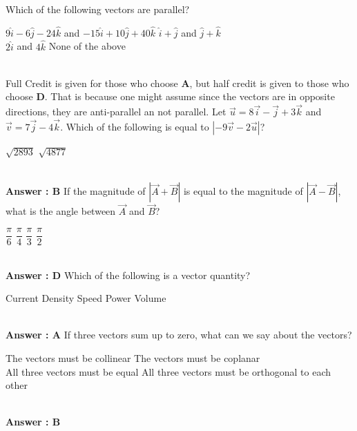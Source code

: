 \documentclass[12pt,addpoints]{exam}
\begin{document}
{{{\begin{questions}
					\question Which of the following vectors are parallel? \\
					\begin{oneparchoices}
						\choice $9\hat i - 6\hat j - 24\hat k$ and $-15\hat i+ 10\hat j+ 40\hat k$
						\choice $\hat i + \hat j$ and $\hat j+ \hat k$ \\
						\choice $2\hat i$ and $4\hat k$
						\choice None of the above
					\end{oneparchoices}
					\\ Full Credit is given for those who choose \textbf{A}, but half credit is given to those who choose \textbf{D}. That is because one might assume since the vectors are in opposite directions, they are anti-parallel an not parallel.
					\question Let $\vec u = 8\vec i - \vec j + 3\vec k$ and $\vec v = 7\vec j - 4\vec k$. Which of the following is equal to $| { - 9\vec v - 2\vec u}|$? \\
					\begin{oneparchoices}
						\choice $\sqrt{2893}$
						\choice $\sqrt{4877}$
						\choice 26
						\choice 90
					\end{oneparchoices}
					\\ \textbf{Answer : B}
					\question If the magnitude of $|\vec{A}+\vec{B}|$ is equal to the magnitude of $|\vec{A}-\vec{B}|$, what is the angle between $\vec{A}$ and $\vec{B}$? \\
					\begin{oneparchoices}
						\choice $\dfrac{\pi}{6}$
						\choice $\dfrac{\pi}{4}$
						\choice $\dfrac{\pi}{3}$
						\choice $\dfrac{\pi}{2}$
					\end{oneparchoices}
					\\ \textbf{Answer : D}
					\question Which of the following is a vector quantity? \\
					\begin{oneparchoices}
						\choice Current Density
						\choice Speed
						\choice Power
						\choice Volume
					\end{oneparchoices}
					\\ \textbf{Answer : A}
					\question If three vectors sum up to zero, what can we say about the vectors? \\
					\begin{oneparchoices}
						\choice The vectors must be collinear
						\choice The vectors must be coplanar \\
						\choice All three vectors must be equal
						\choice All three vectors must be orthogonal to each other
					\end{oneparchoices}
					\\ \textbf{Answer : B}

\end{questions}}}}
\end{document}
